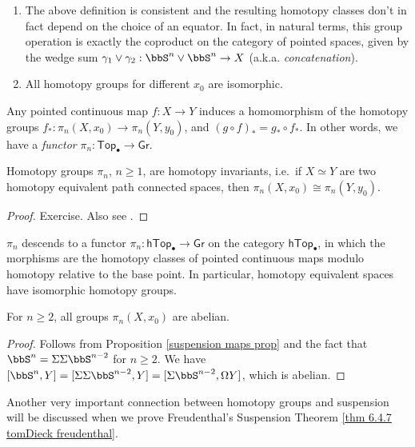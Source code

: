 \begin{xca}
\begin{enumerate}
    \item The above definition is consistent and the resulting homotopy classes don't in fact depend on the choice of an equator. In fact, in natural terms, this group operation is exactly the coproduct on the category of pointed spaces, given by the wedge sum $\gamma_1\lor\gamma_2:\bbS^n\lor \bbS^n\to X$ (a.k.a. \emph{concatenation}).
    \item All homotopy groups for different $x_0$ are isomorphic.
\end{enumerate}
\end{xca}


\begin{prop}[Functoriality of $\pi_n$]
    Any pointed continuous map $f:X\to Y$ induces a homomorphism of the homotopy groups $f_\ast:\pi_n(X,x_0)\to \pi_n(Y,y_0)$, and $(g\circ f)_\ast=g_\ast\circ f_\ast$. In other words, we have a \emph{functor} $\pi_n:\mathsf{Top}_\bullet\to \mathsf{Gr}$.
\end{prop}

\begin{thm}
Homotopy groups $\pi_n$, $n\geq 1$, are homotopy invariants, i.e.\ if $X\simeq Y$ are two homotopy equivalent path connected spaces, then $\pi_n(X,x_0)\cong\pi_n(Y,y_0)$.
\end{thm}
\begin{proof}
Exercise. Also see \cite{Hatcher}.
\end{proof}
\begin{cor}
    $\pi_n$ descends to a functor $\pi_n:\mathsf{hTop}_\bullet\to \mathsf{Gr}$ on the category $\mathsf{hTop}_\bullet$, in which the morphisms are the homotopy classes of pointed continuous maps modulo homotopy relative to the base point. In particular, homotopy equivalent spaces have isomorphic homotopy groups.
\end{cor}

\begin{thm}
For $n\geq 2$, all groups $\pi_n(X,x_0)$ are abelian.
\end{thm}
\begin{proof}
Follows from Proposition \ref{suspension maps prop} and the fact that $\bbS^n=\Sigma\Sigma \bbS^{n-2}$ for $n\geq 2$. We have $[\bbS^n,Y]=[\Sigma\Sigma \bbS^{n-2},Y]=[\Sigma \bbS^{n-2}, \Omega Y]$, which is abelian.
\end{proof}

Another very important connection between homotopy groups and suspension will be discussed when we prove Freudenthal's Suspension Theorem \ref{thm 6.4.7 tomDieck freudenthal}.

